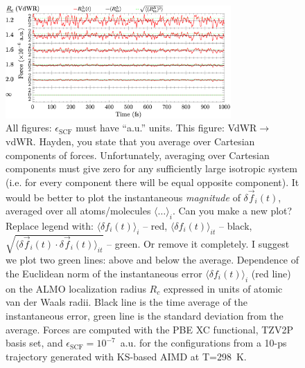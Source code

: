 \documentclass[aps,prl,reprint,amsmath,amssymb]{revtex4-1}
\begin{document}
\begin{figure}[t]
\includegraphics[trim={0.1cm 0cm 0.2cm 0.1cm},clip,width=8.6cm]{DeltaForceComparison_ALMO_SCF.eps}
\caption{\label{fig:forcecomp} {\color{red} All figures: $\epsilon_{\text{SCF}}$ must have ``a.u.'' units. This figure: VdWR$\rightarrow$vdWR. Hayden, you state that you average over Cartesian components of forces. Unfortunately, averaging over Cartesian components must give zero for any sufficiently large isotropic system (i.e. for every component there will be equal  opposite component). It would be better to plot the instantaneous \emph{magnitude} of $\delta \vec{f}_i(t)$, averaged over all atoms/molecules $\langle \ldots \rangle_i$. Can you make a new plot? Replace legend with: $\langle \delta f_i(t) \rangle_i$ -- red, $\langle \delta f_i(t) \rangle_{it}$ -- black, $\sqrt{\langle \delta \vec{f}_i(t) \cdot \delta \vec{f}_i(t) \rangle_{it}}$ -- green. Or remove it completely. I suggest we plot two green lines: above and below the average.} Dependence of the Euclidean norm of the instantaneous error $\langle \delta f_i(t) \rangle_i$ (red line) on the ALMO localization radius $R_c$ expressed in units of atomic van der Waals radii. Black line is the time average of the instantaneous error, green line is the standard deviation from the average. %
Forces are computed with the PBE XC functional, TZV2P basis set, and $\epsilon_{\text{SCF}} = 10^{-7}$~a.u. for the configurations from a 10-ps trajectory generated with KS-based AIMD at T=298~K.}
\end{figure}

\end{document}
